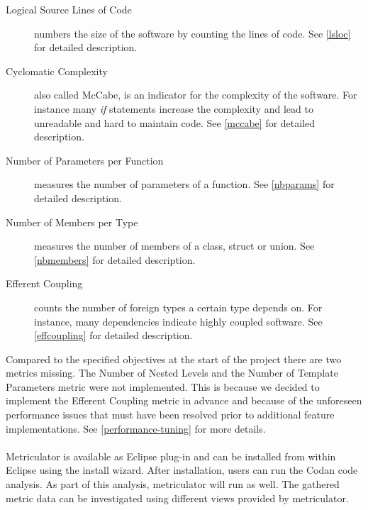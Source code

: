 \documentclass[11pt,a4paper,oneside]{scrreprt}
\begin{document}
\begin{description}
\item[Logical Source Lines of Code] numbers the size of the software by counting the lines of code. See \ref{lsloc} for detailed description.
\item[Cyclomatic Complexity] also called McCabe, is an indicator for the complexity of the software. For instance many \textit{if} statements increase the complexity and lead to unreadable and hard to maintain code. See \ref{mccabe} for detailed description.
\item[Number of Parameters per Function] measures the number of parameters of a function. See \ref{nbparams} for detailed description.
\item[Number of Members per Type] measures the number of members of a class, struct or union. See \ref{nbmembers} for detailed description.
\item[Efferent Coupling] counts the number of foreign types a certain type depends on. For instance, many dependencies indicate highly coupled software. See \ref{effcoupling} for detailed description.
\end{description}

Compared to the specified objectives at the start of the project there are two metrics missing. The Number of Nested Levels
and the Number of Template Parameters metric were not implemented. This is because we decided to implement the Efferent Coupling metric in advance and because of the unforeseen performance issues that must have been resolved prior to additional feature implementations. See \ref{performance-tuning} for more details.
\\\\
Metriculator is available as Eclipse plug-in and can be installed from within Eclipse using the install wizard. After installation, users can run the Codan code analysis. As part of this analysis, metriculator will run as well. The gathered metric data can be investigated using different views provided by metriculator.
\end{document}
